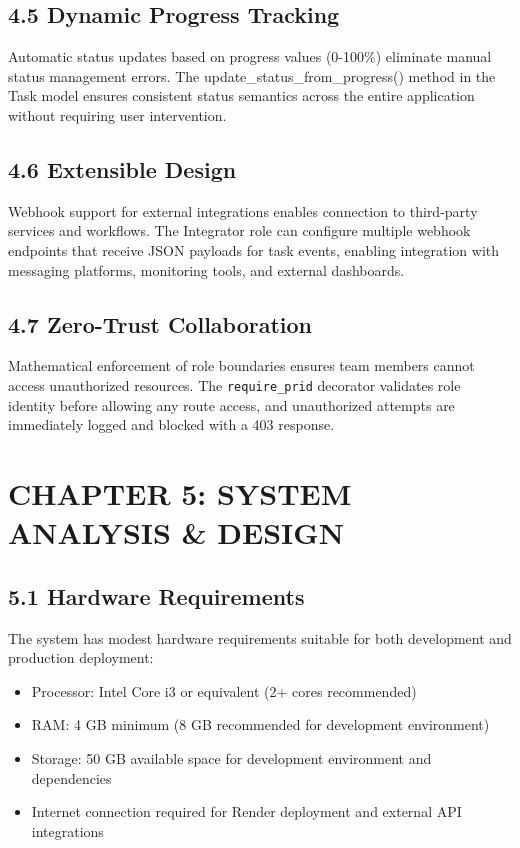 ﻿\documentclass[12pt]{article}
\def\normaltext{\fontsize{12pt}{18pt}\color{secondary}}
\begin{document}
\subsection*{4.5 Dynamic Progress Tracking}
Automatic status updates based on progress values (0-100\%) eliminate manual status management errors. The update\_status\_from\_progress() method in the Task model ensures consistent status semantics across the entire application without requiring user intervention.

\subsection*{4.6 Extensible Design}
Webhook support for external integrations enables connection to third-party services and workflows. The Integrator role can configure multiple webhook endpoints that receive JSON payloads for task events, enabling integration with messaging platforms, monitoring tools, and external dashboards.

\subsection*{4.7 Zero-Trust Collaboration}
Mathematical enforcement of role boundaries ensures team members cannot access unauthorized resources. The \texttt{require\_prid} decorator validates role identity before allowing any route access, and unauthorized attempts are immediately logged and blocked with a 403 response.
\newpage

\section*{{\color{primary}CHAPTER 5: SYSTEM ANALYSIS \& DESIGN}}
\normaltext

\subsection*{5.1 Hardware Requirements}
The system has modest hardware requirements suitable for both development and production deployment:
\begin{itemize}
\item Processor: Intel Core i3 or equivalent (2+ cores recommended)
\item RAM: 4 GB minimum (8 GB recommended for development environment)
\item Storage: 50 GB available space for development environment and dependencies
\item Internet connection required for Render deployment and external API integrations
\end{itemize}
\end{document}
